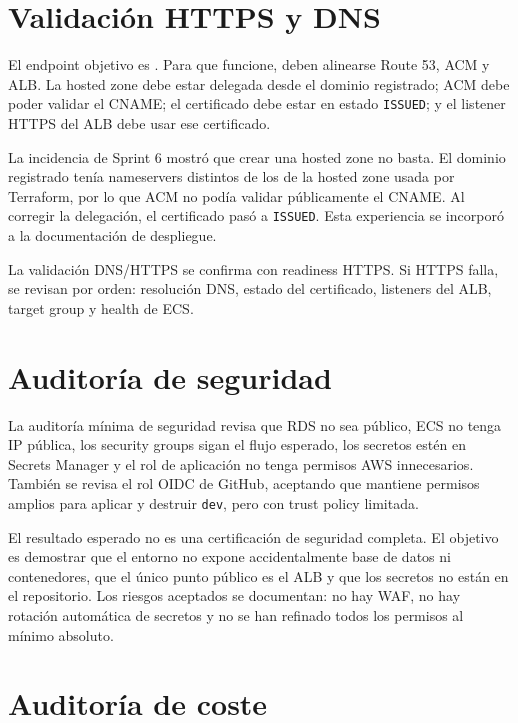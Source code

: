 \section{Validación HTTPS y DNS}
\label{sec:anexo-https-dns}

El endpoint objetivo es . Para que funcione, deben alinearse Route 53, ACM y ALB. La hosted zone debe estar delegada desde el dominio registrado; ACM debe poder validar el CNAME; el certificado debe estar en estado \texttt{ISSUED}; y el listener HTTPS del ALB debe usar ese certificado.

La incidencia de Sprint 6 mostró que crear una hosted zone no basta. El dominio registrado tenía nameservers distintos de los de la hosted zone usada por Terraform, por lo que ACM no podía validar públicamente el CNAME. Al corregir la delegación, el certificado pasó a \texttt{ISSUED}. Esta experiencia se incorporó a la documentación de despliegue.

La validación DNS/HTTPS se confirma con readiness HTTPS. Si HTTPS falla, se revisan por orden: resolución DNS, estado del certificado, listeners del ALB, target group y health de ECS.

\section{Auditoría de seguridad}
\label{sec:anexo-auditoria-seguridad}

La auditoría mínima de seguridad revisa que RDS no sea público, ECS no tenga IP pública, los security groups sigan el flujo esperado, los secretos estén en Secrets Manager y el rol de aplicación no tenga permisos AWS innecesarios. También se revisa el rol OIDC de GitHub, aceptando que mantiene permisos amplios para aplicar y destruir \texttt{dev}, pero con trust policy limitada.

El resultado esperado no es una certificación de seguridad completa. El objetivo es demostrar que el entorno no expone accidentalmente base de datos ni contenedores, que el único punto público es el ALB y que los secretos no están en el repositorio. Los riesgos aceptados se documentan: no hay WAF, no hay rotación automática de secretos y no se han refinado todos los permisos al mínimo absoluto.

\section{Auditoría de coste}
\label{sec:anexo-auditoria-coste}

